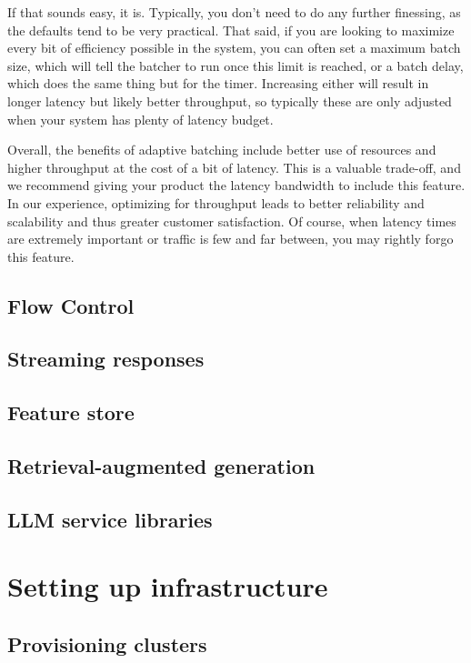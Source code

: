 If that sounds easy, it is. Typically, you don't need to do any further finessing, as the defaults tend to be very practical. That said, if you are looking to maximize every bit of efficiency possible in the system, you can often set a maximum batch size, which will tell the batcher to run once this limit is reached, or a batch delay, which does the same thing but for the timer. Increasing either will result in longer latency but likely better throughput, so typically these are only adjusted when your system has plenty of latency budget.

Overall, the benefits of adaptive batching include better use of resources and higher throughput at the cost of a bit of latency. This is a valuable trade-off, and we recommend giving your product the latency bandwidth to include this feature. In our experience, optimizing for throughput leads to better reliability and scalability and thus greater customer satisfaction. Of course, when latency times are extremely important or traffic is few and far between, you may rightly forgo this feature.


\subsection{Flow Control}

\subsection{Streaming responses}
\subsection{Feature store}
\subsection{Retrieval-augmented generation}
\subsection{LLM service libraries}

\section{Setting up infrastructure}
\subsection{Provisioning clusters}
